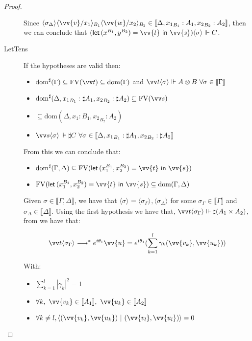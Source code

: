 \documentclass[runningheads,orivec,envcountsame,envcountsect]{llncs}
\newcommand\lra{\longrightarrow}
\newcommand\ansubst[2]{\ensuremath{\langle #1 \rangle_{#2}}}
\newcommand\dom[1]{\mathrm{dom}(#1)}
\newcommand\sdom[1]{\mathrm{dom}^{\sharp}(#1)}
\newcommand\FV[1]{\mathrm{FV}(#1)}
\def\scal#1#2{\langle{#1}~|~{#2}\rangle}
\def\Pair#1#2{(#1,#2)} %
\def\letkeyword{\mathsf{let}}
\def\inkeyword{\mathsf{in}}
\def\LetP#1#2#3#4#5#6{\letkeyword\,\Pair{#1^{#2}}{#3^{#4}}=#5~\inkeyword~#6}
\def\eval{\lra^*}
\def\sem#1{\llbracket#1\rrbracket}
\def\real{\Vdash}
\begin{document}
\begin{proof}
\begin{description}
    Since $\ansubst{\sigma_\Delta}{}\ansubst{\vv{v}/x_1}{B_1}\ansubst{\vv{w}/x_2}{B_2}\in\sem{\Delta,{x_1}_{B_1}:A_1,{x_2}_{B_2}:A_2}$, then we can conclude that $(\LetP{x}{B_1}{y}{B_2}{\vv{t}}{\vv{s}})\ansubst{\sigma}{}\real C$.

    \item[LetTens] If the hypotheses are valid then:
    \begin{itemize}
        \item $\sdom{\Gamma}\subseteq \FV{\vv t} \subseteq \dom{\Gamma}$ and $\vv t \ansubst{\sigma}{}\Vdash A\otimes B\ \forall \sigma\in\sem\Gamma$
        \item $\sdom{\Delta, {x_1}_{B_1}:\sharp A_1, {x_2}_{B_2}:\sharp A_2}\subseteq \FV{\vv s}$
        \item $\subseteq \dom{\Delta,{x_1}:{B_1}, {x_2}_{B_2}:A_2}$
        \item $\vv s \ansubst{\sigma}{}\Vdash \sharp C\ \forall \sigma\in\sem{\Delta, {x_1}_{B_1}:\sharp A_1, {x_2}_{B_2}:\sharp A_2}$
    \end{itemize}
    
    From this we can conclude that:
    \begin{itemize}
        \item $\sdom{\Gamma,\Delta}\subseteq\FV{\LetP{x_1}{B_1}{x_2}{B_2}{\vv{t}}{\vv{s}}}$
        \item $\FV{\LetP{x_1}{B_1}{x_2}{B_2}{\vv{t}}{\vv{s}}}\subseteq\dom{\Gamma,\Delta}$
    \end{itemize}
    
    Given $\sigma\in\sem{\Gamma,\Delta}$, we have that $\ansubst{\sigma}{}=\ansubst{\sigma_\Gamma}{},\ansubst{\sigma_\Delta}{}$ for some $\sigma_\Gamma\in\sem\Gamma$ and $\sigma_\Delta\in\sem\Delta$. Using the first hypothesis we have that, $\vv t\ansubst{\sigma_\Gamma}{}\real \sharp(A_1\times A_2)$, from  we have that:
    
    \[\vv t\ansubst{\sigma_\Gamma}{}\eval e^{i\theta_1}\vv{u}=e^{i\theta_1}(\sum_{k=1}^{l} \gamma_k \Pair{\vv{v_k}}{\vv{u_k}})\] 
    
    With:
    \begin{itemize}
        \item $\sum_{k=1}^{l} |\gamma_k|^2 = 1$
        \item $\forall k,\ \vv{v_k}\in\sem{A_1},\ \vv{u_k}\in\sem{A_2}$
        \item $\forall k\neq l, \scal{\Pair{\vv{v_k}}{\vv{u_k}}}{\Pair{\vv{v_l}}{\vv{u_l}}}= 0$
    \end{itemize}
    

\end{description}
\end{proof}
\end{document}
